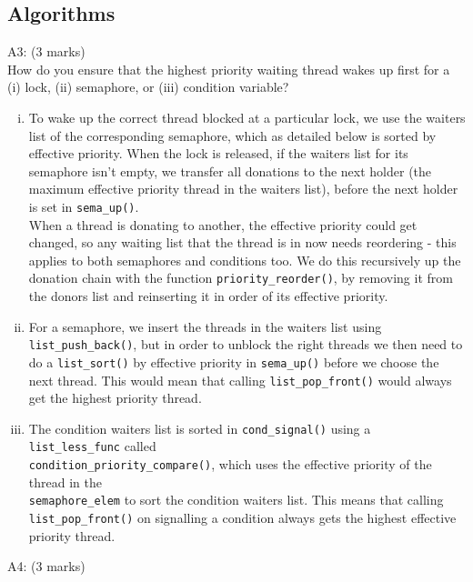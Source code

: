 \documentclass[11pt, a4paper]{article}
\begin{document}
	\subsection{Algorithms}
		A3: (3 marks)\\
		How do you ensure that the highest priority waiting thread wakes up first for a (i) lock, 
		(ii) semaphore, or (iii) condition variable?
		\begin{enumerate}[(i)]
		  \item To wake up the correct thread blocked at
		  a particular lock, we use the waiters list of 
		  the corresponding semaphore, which as detailed
		  below is sorted by effective priority.
		  When the lock is released, if the
		  waiters list for its semaphore isn't
		  empty, we transfer all donations to the next 
      holder (the maximum effective priority thread
      in the waiters list), before the next holder is
      set in \verb+sema_up()+.\\
		  When a thread is donating to another, the
		  effective priority could get changed, so any waiting
		  list that the thread is in now needs reordering
		  - this applies to both semaphores and conditions
		  too. We do this recursively up the donation chain
        with the function \verb+priority_reorder()+, by removing it
        from the donors list and reinserting it in order
        of its effective priority.

         \item For a semaphore, we insert the threads
         in the waiters list using
         \verb+list_push_back()+, but in order
         to unblock the right threads we then need to do a \verb+list_sort()+
         by effective priority in \verb+sema_up()+ before we choose the next thread. This would mean that 
         calling \verb+list_pop_front()+ would always get the
         highest priority thread.

        \item The condition waiters list is sorted in
          \verb+cond_signal()+ using
        a \verb+list_less_func+ called\\ 
        \verb+condition_priority_compare()+, which uses
        the effective priority of the thread in the\\
        \verb+semaphore_elem+ to sort the condition waiters
        list. This means that calling \verb+list_pop_front()+
        on signalling a condition always gets the highest
        effective priority thread.
        \end{enumerate}
		A4: (3 marks)\\
\end{document}
